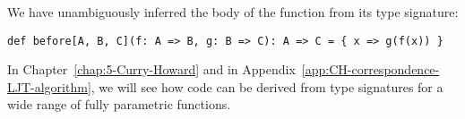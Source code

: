 We have unambiguously inferred the body of the function from its type
signature:
\begin{lstlisting}
def before[A, B, C](f: A => B, g: B => C): A => C = { x => g(f(x)) }
\end{lstlisting}

In Chapter~\ref{chap:5-Curry-Howard} and in Appendix~\ref{app:CH-correspondence-LJT-algorithm},
we will see how code can be derived from type signatures for a wide
range of fully parametric functions.
